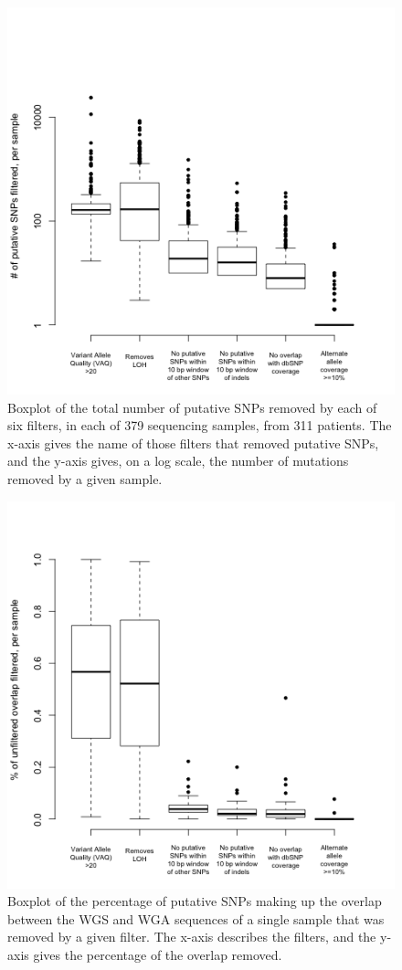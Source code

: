 \documentclass[11pt]{article} %
\begin{document}
\begin{figure}
\includegraphics[scale=1.0]{boxplot_number_filtered.png}
\caption{Boxplot of the total number of putative SNPs removed by each of six filters, in each of 379 sequencing samples, from 311 patients. The x-axis gives the name of those filters that removed putative SNPs, and the y-axis gives, on a log scale, the number of mutations removed by a given sample.}
\end{figure}

\begin{figure}
\includegraphics[scale=1.0]{boxplot_percent_overlap_filtered.png}
\caption{Boxplot of the percentage of putative SNPs making up the overlap between the WGS and WGA sequences of a single sample that was removed by a given filter. The x-axis describes the filters, and the y-axis gives the percentage of the overlap removed.}
\end{figure}



\end{document}
